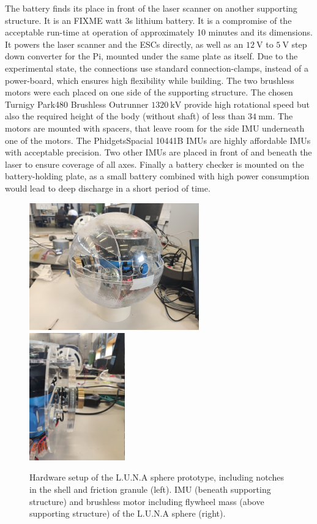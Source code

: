 The battery finds its place in front of the laser scanner on another supporting structure. It is an FIXME watt 3s lithium battery. It is a compromise of the acceptable run-time at operation of approximately 10 minutes and its dimensions. It powers the laser scanner and the ESCs directly, as well as an $\SI{12}{\volt}$ to $\SI{5}{\volt}$ step down converter for the Pi, mounted under the same plate as itself. Due to the experimental state, the connections use standard connection-clamps, instead of a power-board, which ensures high flexibility while building. 
The two brushless motors were each placed on one side of the supporting structure. The chosen Turnigy Park480 Brushless Outrunner $\SI{1320}{\kilo\volt}$ \cite{turnigymotor} provide high rotational speed but also the required height of the body (without shaft) of less than $\SI{34}{\milli\meter}$.
The motors are mounted with spacers, that leave room for the side IMU underneath one of the motors. 
The PhidgetsSpacial 10441B IMUs \cite{imuphidgets} are highly affordable IMUs with acceptable precision.
Two other IMUs are placed in front of and beneath the laser to ensure coverage of all axes. 
Finally a battery checker is mounted on the battery-holding plate, as a small battery combined with high power consumption would lead to deep discharge in a short period of time.

\begin{figure}
\centering
\includegraphics[height=55mm]{../Media/sphereFullshellLeft.jpg}
\hfill
\includegraphics[height=55mm]{../Media/sphereRightMotor.jpg}   
\caption{Hardware setup of the L.U.N.A sphere prototype, including notches in the shell and friction granule (left). IMU (beneath supporting structure) and brushless motor  including flywheel mass (above supporting structure) of the L.U.N.A sphere (right).}
\label{sec:TechnicalApproach:fig:setup}
\end{figure}

